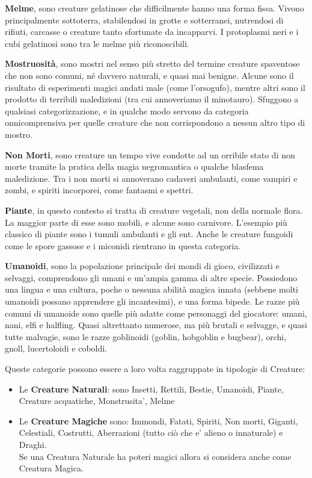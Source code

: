 \begin{multicols}{2}
\medskip\textbf{Melme}, sono creature gelatinose che difficilmente hanno una forma fissa. Vivono principalmente sottoterra, stabilendosi in grotte e sotterranei, nutrendosi di rifiuti, carcasse o creature tanto sfortunate da incapparvi. I protoplasmi neri e i cubi gelatinosi sono tra le melme più riconoscibili.

\medskip\textbf{Mostruosità}, sono mostri nel senso più stretto del termine creature spaventose che non sono comuni, né davvero naturali, e quasi mai benigne. Alcune sono il risultato di esperimenti magici andati male (come l'orsogufo), mentre altri sono il prodotto di terribili maledizioni (tra cui annoveriamo il minotauro). Sfuggono a qualsiasi categorizzazione, e in qualche modo servono da categoria onnicomprensiva per quelle creature che non corrispondono a nessun altro tipo di mostro. 

\medskip\textbf{Non Morti}, sono creature un tempo vive condotte ad un orribile stato di non morte tramite la pratica della magia negromantica o qualche blasfema maledizione. Tra i non morti si annoverano cadaveri ambulanti, come vampiri e zombi, e spiriti incorporei, come fantasmi e spettri.

\medskip\textbf{Piante}, in questo contesto si tratta di creature vegetali, non della normale flora. La maggior parte di esse sono mobili, e alcune sono carnivore. L'esempio più classico di piante sono i tumuli ambulanti e gli ent. Anche le creature fungoidi come le spore gassose e i miconidi rientrano in questa categoria.

\medskip\textbf{Umanoidi}, sono la popolazione principale dei mondi di gioco, civilizzati e selvaggi, comprendono gli umani e un'ampia gamma di altre specie. Possiedono una lingua e una cultura, poche o nessuna abilità magica innata (sebbene molti umanoidi possano apprendere gli incantesimi), e una forma bipede. Le razze più comuni di umanoide sono quelle più adatte come personaggi del giocatore: umani, nani, elfi e halfling. Quasi altrettanto numerose, ma più brutali e selvagge, e quasi tutte malvagie, sono le razze goblinoidi (goblin, hobgoblin e bugbear), orchi, gnoll, lucertoloidi e coboldi.\\

\medskip

Queste categorie possono essere a loro volta raggruppate in tipologie di Creature:
\smallskip
\begin{itemize}
\item
Le \textbf{Creature Naturali}: sono Insetti, Rettili, Bestie, Umanoidi, Piante, Creature acquatiche, Monstrusita', Melme
\item
Le \textbf{Creature Magiche} sono: Immondi, Fatati, Spiriti, Non morti, Giganti, Celestiali, Costrutti, Aberrazioni (tutto ciò che e' alieno o innaturale) e Draghi.\\
Se una Creatura Naturale ha poteri magici allora si considera anche come Creatura Magica.
\end{itemize}



\end{multicols}
